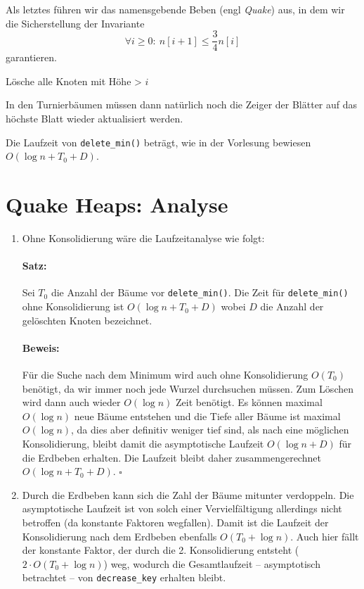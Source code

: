 \documentclass[a4paper,10pt]{article}
\begin{document}
\begin{description}
\begin{algorithmic}
        \ENDWHILE
    \ENDFOR
    \end{algorithmic}
    Als letztes führen wir das namensgebende Beben (engl \emph{Quake}) aus, in dem wir die Sicherstellung der Invariante
    \[\forall i \geq 0{:}\ n[i+1] \leq \frac{3}{4} n[i]\]
    garantieren.
    \begin{algorithmic}
            \STATE Lösche alle Knoten mit Höhe > $i$
        \ENDIF
    \ENDFOR
    \end{algorithmic}
    In den Turnierbäumen müssen dann natürlich noch die Zeiger der Blätter auf das höchste Blatt wieder aktualisiert werden.
    
    Die Laufzeit von \verb!delete_min()! beträgt, wie in der Vorlesung bewiesen $O(\log n + T_0 + D)$.
\end{description}

\section{Quake Heaps: Analyse}
\begin{enumerate}
\item   Ohne Konsolidierung wäre die Laufzeitanalyse wie folgt:
        \paragraph*{Satz:} Sei $T_0$ die Anzahl der Bäume vor \verb!delete_min()!. Die Zeit für \verb!delete_min()! ohne Konsolidierung ist $O(\log n + T_0 + D)$ wobei $D$ die Anzahl der gelöschten Knoten bezeichnet.
        \paragraph*{Beweis:} Für die Suche nach dem Minimum wird auch ohne Konsolidierung $O(T_0)$ benötigt, da wir immer noch jede Wurzel durchsuchen müssen.
        Zum Löschen wird dann auch wieder $O(\log n)$ Zeit benötigt.
        Es können maximal $O(\log n)$ neue Bäume entstehen und die Tiefe aller Bäume ist maximal $O(\log n)$, da dies aber definitiv weniger tief sind, als nach eine möglichen Konsolidierung, bleibt damit die asymptotische Laufzeit $O(\log n + D)$ für die Erdbeben erhalten.
        Die Laufzeit bleibt daher zusammengerechnet $O(\log n + T_0 + D)$. \hfill $\square$
\item   Durch die Erdbeben kann sich die Zahl der Bäume mitunter verdoppeln. 
        Die asymptotische Laufzeit ist von solch einer Vervielfältigung allerdings nicht betroffen (da konstante Faktoren wegfallen).
        Damit ist die Laufzeit der Konsolidierung nach dem Erdbeben ebenfalls $O(T_0 + \log n)$.
        Auch hier fällt der konstante Faktor, der durch die 2. Konsolidierung entsteht ($2 \cdot O(T_0 + \log n)$) weg, wodurch die Gesamtlaufzeit -- asymptotisch betrachtet -- von \verb!decrease_key! erhalten bleibt.
\end{enumerate}
\end{document}
